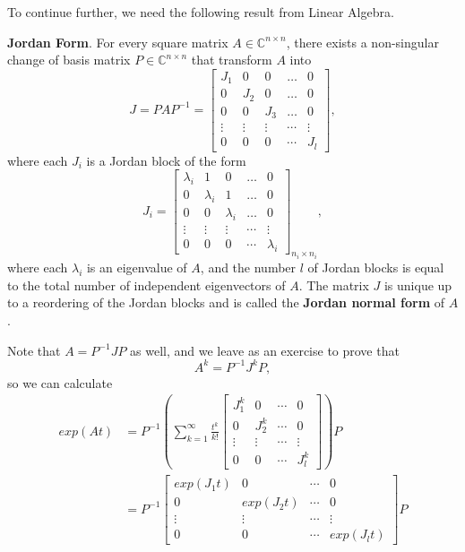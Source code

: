 To continue further, we need the following result from Linear Algebra.
\begin{theorem}
\textbf{Jordan Form}. For every square matrix $A\in\mathbb{C}^{n \times n}$, there exists a non-singular change of basis matrix $P\in\mathbb{C}^{n \times n}$ that transform $A$ into
\begin{equation}
	J = PAP^{-1} = \begin{bmatrix}
		J_1 & 0 & 0 & \dots & 0 \\
		0 & J_2 & 0 & \dots & 0 \\
		0 & 0 & J_3 & \dots & 0 \\
		\vdots & \vdots & \vdots & \cdots & \vdots \\
		0 & 0 & 0 & \cdots & J_l
	\end{bmatrix},
\end{equation}
where each $J_i$ is a Jordan block of the form
	\begin{equation}
	J_i = \begin{bmatrix}
\lambda_i & 1 & 0 & \dots & 0 \\
		0 & \lambda_i & 1 & \dots & 0 \\
		0 & 0 & \lambda_i & \dots & 0 \\
		\vdots & \vdots & \vdots & \cdots & \vdots \\
		0 & 0 & 0 & \cdots & \lambda_i
	\end{bmatrix}_{n_i\times n_i},
	\end{equation}
	where each $\lambda_i$ is an eigenvalue of $A$, and the number $l$ of Jordan blocks is equal to the total number of independent eigenvectors of $A$. The matrix $J$ is unique up to a reordering of the Jordan blocks and is called the \textbf{Jordan normal form} of $A$.
\end{theorem}

Note that $A = P^{-1}JP$ as well, and we leave as an exercise to prove that
\begin{equation}
	A^k = P^{-1} J^k P,
\end{equation}
so we can calculate
\begin{align}
	exp(At) &= P^{-1}\left(\sum_{k=1}^\infty \frac{t^k}{k!} \begin{bmatrix}J_1^k & 0 & \cdots & 0 \\ 0 & J_2^k & \cdots & 0 \\ \vdots & \vdots & \cdots & \vdots \\ 0 & 0 & \cdots & J_l^k \end{bmatrix} \right) P \nonumber \\
		&= P^{-1} \begin{bmatrix}exp(J_1t) & 0 & \cdots & 0 \\ 0 & exp(J_2t) & \cdots & 0 \\ \vdots & \vdots & \cdots & \vdots \\ 0 & 0 & \cdots & exp(J_lt) \end{bmatrix} P
\end{align}


